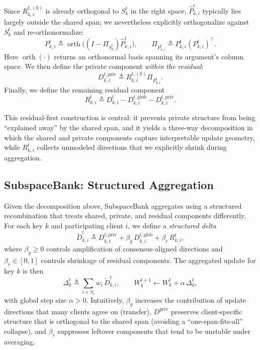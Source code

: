 \documentclass{article}
\theoremstyle{plain}
\theoremstyle{definition}
\theoremstyle{remark}
\begin{document}
Since $R_{k,i}^{t,(0)}$ is already orthogonal to $S_k^t$ in the right space, $\hat P_{k,i}^t$ typically lies largely outside the shared span; we nevertheless explicitly orthogonalize against $S_k^t$ and re-orthonormalize:
\begin{equation}
  P_{k,i}^t \triangleq \operatorname{orth}\!\big((I-\Pi_{S_k^t})\hat P_{k,i}^t\big),
  \qquad
  \Pi_{P_{k,i}^t}\triangleq P_{k,i}^t (P_{k,i}^t)^\top.
  \label{eq:priv_basis}
\end{equation}
Here $\operatorname{orth}(\cdot)$ returns an orthonormal basis spanning its argument’s column space. We then define the private component \emph{within the residual}:
\begin{equation}
  D_{k,i}^{t,\mathrm{priv}} \triangleq R_{k,i}^{t,(0)} \Pi_{P_{k,i}^t}.
  \label{eq:priv_comp}
\end{equation}
Finally, we define the remaining residual component
\begin{equation}
  R_{k,i}^t \triangleq D_{k,i}^t - D_{k,i}^{t,\mathrm{glob}} - D_{k,i}^{t,\mathrm{priv}}.
  \label{eq:final_resid}
\end{equation}

This residual-first construction is central: it prevents private structure from being ``explained away'' by the shared span, and it yields a three-way decomposition in which the shared and private components capture interpretable update geometry, while $R_{k,i}^t$ collects unmodeled directions that we explicitly shrink during aggregation.


\subsection{SubspaceBank: Structured Aggregation}
\label{sec:structured-agg}

Given the decomposition above, SubspaceBank aggregates using a structured recombination that treats shared, private, and residual components differently. For each key $k$ and participating client $i$, we define a \emph{structured delta}
\begin{equation}
  \tilde D_{k,i}^t
  \triangleq
  D_{k,i}^{t,\mathrm{priv}}
  + \beta_g\, D_{k,i}^{t,\mathrm{glob}}
  + \beta_r\, R_{k,i}^t,
  \label{eq:structured_delta}
\end{equation}
where $\beta_g\ge 0$ controls amplification of consensus-aligned directions and $\beta_r\in[0,1]$ controls shrinkage of residual components. The aggregated update for key $k$ is then
\begin{equation}
  \Delta_k^t \triangleq \sum_{i\in S_t} w_i\, \tilde D_{k,i}^t,
  \qquad
  W_k^{t+1} \leftarrow W_k^t + \alpha\, \Delta_k^t,
  \label{eq:agg_update}
\end{equation}
with global step size $\alpha>0$. Intuitively, $\beta_g$ increases the contribution of update directions that many clients agree on (transfer), $D^{\mathrm{priv}}$ preserves client-specific structure that is orthogonal to the shared span (avoiding a ``one-span-fits-all'' collapse), and $\beta_r$ suppresses leftover components that tend to be unstable under averaging.
\end{document}
